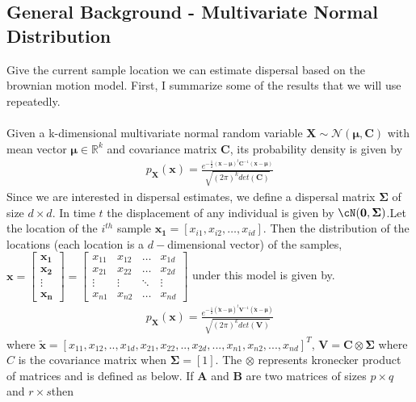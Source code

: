 \subsection{General Background - Multivariate Normal Distribution}
Give the current sample location we can estimate dispersal based on the brownian motion model. First, I summarize some of the results that we will use repeatedly.  \\ \\ 
Given a k-dimensional multivariate normal random variable $\mathbf{X} \sim \mathcal{N}(\boldsymbol{\mu}, \mathbf{C}) $ with mean vector $\boldsymbol{\mu} \in \mathbb{R}^k$ and covariance matrix $\mathbf{C}$, its probability density is given by
\begin{eqnarray*}
    p_{\mathbf{X}}({\mathbf{x}}) = \displaystyle \frac{ e^{ -\frac{1}{2} (\mathbf{x}- \boldsymbol{\mu})^t \mathbf{C}^{-1} (\mathbf{x}- \boldsymbol{\mu}) } }{\sqrt{ (2 \pi)^k det(\mathbf{C}) }}
\end{eqnarray*}
Since we are interested in dispersal estimates, we define a dispersal matrix $\boldsymbol{\Sigma}$ of size $d \times d$. In time $t$ the displacement of any individual is given by $\cN(\mathbf{0},\boldsymbol{\Sigma})$.Let the location of the $i^{th}$ sample $\mathbf{x_1} = [x_{i1}, x_{i2}, \hdots, x_{id}]$. Then the distribution of the locations (each location is a $d-$dimensional vector) of the samples, $\mathbf{x} = \begin{bmatrix}
    \mathbf{x_1} \\
    \mathbf{x_2} \\
    \vdots \\
    \mathbf{x_n}
\end{bmatrix} =\begin{bmatrix}
    x_{11} & x_{12} & \hdots & x_{1d} \\
    x_{21} & x_{22} & \hdots & x_{2d} \\
    \vdots & \vdots &\ddots & \vdots \\ 
    x_{n1} & x_{n2} & \hdots & x_{nd}
\end{bmatrix}$ under this model is given by. 
\begin{eqnarray*}
    p_{\mathbf{X} }({\mathbf{x}}) = \displaystyle \frac{ e^{ -\frac{1}{2} (\mathbf{\tilde{x}}- \boldsymbol{\mu})^t \mathbf{V}^{-1} (\mathbf{\tilde{x}}- \boldsymbol{\mu}) } }{\sqrt{ (2 \pi)^k det(\mathbf{V}) }}
\end{eqnarray*}
where $ \mathbf{\tilde{x}} = [x_{11},x_{12},..,x_{1d}, x_{21},x_{22},..,x_{2d},...,x_{n1},x_{n2},...,x_{nd}]^T $, $\mathbf{V} = \mathbf{C} \otimes \boldsymbol{\Sigma} $ where $C$ is the covariance matrix when $\boldsymbol{\Sigma} = [1]$. The $\otimes$ represents kronecker product of matrices and is defined as below. If $\mathbf{A}$ and $\mathbf{B}$ are two matrices of sizes $p \times q$ and $r \times s $then 
